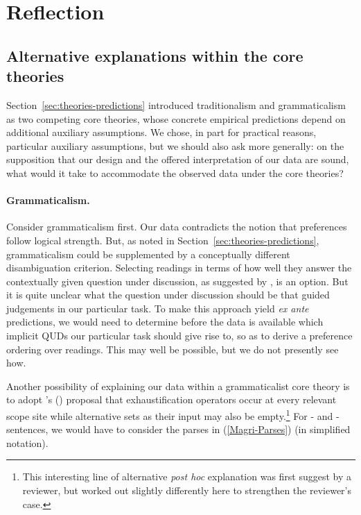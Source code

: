 \documentclass[fleqn,reqno,10pt]{article}
\newcommand{\as}{\acro{as}}
\renewcommand{\es}{\acro{es}}
\begin{document}
\section{Reflection}
\label{sec:critical-reflection}

\subsection{Alternative explanations within the core theories}

Section~\ref{sec:theories-predictions} introduced
traditionalism and grammaticalism as two competing core theories,
whose concrete empirical predictions depend on additional auxiliary
assumptions. We chose, in part for practical reasons, particular
auxiliary assumptions, but we should also ask more generally: on the
supposition that our design and the offered interpretation of our data
are sound, what would it take to accommodate the observed data under
the core theories?

\paragraph{Grammaticalism.} Consider grammaticalism first. Our data
contradicts the notion that preferences follow logical strength. But,
as noted in Section~\ref{sec:theories-predictions}, grammaticalism
could be supplemented by a conceptually different disambiguation
criterion. Selecting readings in terms of how well they answer the
contextually given question under discussion, as suggested by
\citet{Fox2007:Free-Choice-and,GualminiHulsey2008:The-Question-An}, is
an option. But it is quite unclear what the question under discussion
should be that guided judgements in our particular task. To make this
approach yield \emph{ex ante} predictions, we would need to determine
before the data is available which implicit QUDs our particular task
should give rise to, so as to derive a preference ordering over
readings. This may well be possible, but we do not presently see how.

Another possibility of explaining our data within a grammaticalist
core theory is to adopt \citeauthor{Magri2011:Another-Argumen}'s
(\citeyear{Magri2011:Another-Argumen}) proposal that exhaustification
operators occur at every relevant scope site while alternative sets as
their input may also be empty.\footnote{This interesting line of
  alternative \emph{post hoc} explanation was first suggest by a
  reviewer, but worked out slightly differently here to strengthen the
  reviewer's case.} For \as- and \es-sentences, we would have to
consider the parses in (\ref{Magri-Parses}) (in simplified notation).
\end{document}
